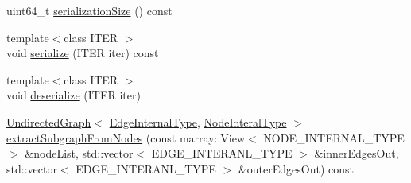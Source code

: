 \begin{DoxyCompactItemize}
\item 
uint64\+\_\+t \hyperlink{classnifty_1_1graph_1_1UndirectedGraph_a331afe7d6d0765cd71af8bf218d4cc36}{serialization\+Size} () const 
\item 
{\footnotesize template$<$class I\+T\+E\+R $>$ }\\void \hyperlink{classnifty_1_1graph_1_1UndirectedGraph_ad39b5a1269522c86a7c5469bbf9df2e1}{serialize} (I\+T\+E\+R iter) const 
\item 
{\footnotesize template$<$class I\+T\+E\+R $>$ }\\void \hyperlink{classnifty_1_1graph_1_1UndirectedGraph_ad64103a26a487c730d69e7daaef38191}{deserialize} (I\+T\+E\+R iter)
\item 
\hyperlink{classnifty_1_1graph_1_1UndirectedGraph}{Undirected\+Graph}$<$ \hyperlink{classnifty_1_1graph_1_1UndirectedGraph_a70e38582c25deca5e0ce080277cb30fc}{Edge\+Internal\+Type}, \hyperlink{classnifty_1_1graph_1_1UndirectedGraph_aa3b43dd44281416b7232caae529e8780}{Node\+Interal\+Type} $>$ \hyperlink{classnifty_1_1graph_1_1UndirectedGraph_a124a705edb8f41f7f2672443fcfb1051}{extract\+Subgraph\+From\+Nodes} (const marray\+::\+View$<$ N\+O\+D\+E\+\_\+\+I\+N\+T\+E\+R\+N\+A\+L\+\_\+\+T\+Y\+P\+E $>$ \&node\+List, std\+::vector$<$ E\+D\+G\+E\+\_\+\+I\+N\+T\+E\+R\+A\+N\+L\+\_\+\+T\+Y\+P\+E $>$ \&inner\+Edges\+Out, std\+::vector$<$ E\+D\+G\+E\+\_\+\+I\+N\+T\+E\+R\+A\+N\+L\+\_\+\+T\+Y\+P\+E $>$ \&outer\+Edges\+Out) const 
\end{DoxyCompactItemize}
